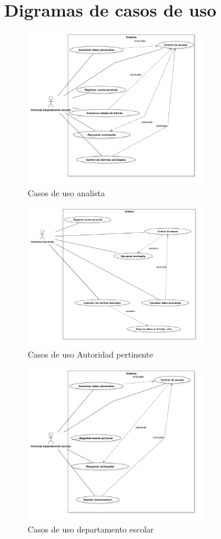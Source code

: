 \section{Digramas de casos de uso}
\begin{figure}[htbp!]
    \centering
        \includegraphics[width=0.7\textwidth]{images/img_casos/Analista.jpg}
    \caption{Casos de uso analista}
\end{figure}

\begin{figure}[htbp!]
    \centering
        \includegraphics[width=0.7\textwidth]{images/img_casos/AutoridadPerninente.jpg}
    \caption{Casos de uso Autoridad pertinente}
\end{figure}

\begin{figure}[htbp!]
    \centering
        \includegraphics[width=0.7\textwidth]{images/img_casos/departamento_escolar.jpg}
    \caption{Casos de uso departamento escolar}
\end{figure}


